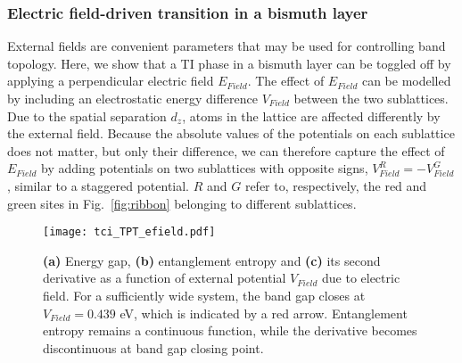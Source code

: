 \subsubsection{Electric field-driven transition in a bismuth layer}
External fields are convenient parameters that may be used for controlling band topology. Here, we show that a TI phase in a bismuth layer can be toggled off by applying a perpendicular electric field $E_{Field}$. The effect of $E_{Field}$ can be modelled by including an electrostatic energy difference $V_{Field}$ between the two sublattices. Due to the spatial separation $d_z$, atoms in the lattice are affected differently by the external field. Because the absolute values of the potentials on each sublattice does not matter, but only their difference, we can therefore capture the effect of $E_{Field}$ by adding potentials on two sublattices with opposite signs, $V^{R}_{Field} = - V^{G}_{Field}$, similar to a staggered potential. $R$ and $G$ refer to, respectively, the red and green sites in Fig.~\ref{fig:ribbon} belonging to different sublattices.
 
\begin{figure}[H]
\centering
\texttt{[image: tci\_TPT\_efield.pdf]}
\caption[Energy gap, entanglement entropy and its second derivative as a function of external potential due to electric field]{\textbf{(a)} Energy gap, \textbf{(b)} entanglement entropy and \textbf{(c)} its second derivative as a function of external potential $V_{Field}$ due to electric field. For a sufficiently wide system, the band gap closes at $V_{Field} = 0.439$ eV, which is indicated by a red arrow. Entanglement entropy remains a continuous function, while the derivative becomes discontinuous at band gap closing point.}
\label{fig:TPT_efield}
\end{figure}

